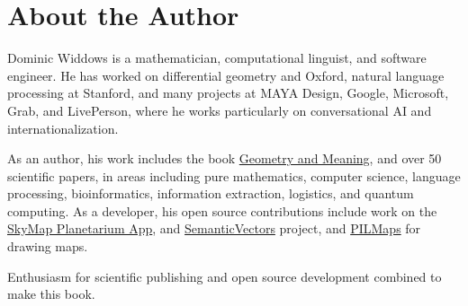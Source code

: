 \chapter{About the Author}

Dominic Widdows is a mathematician, computational linguist, and software engineer.
He has worked on differential geometry and Oxford, natural language processing at Stanford,
and many projects at MAYA Design, Google, Microsoft, Grab, and LivePerson, where he works
particularly on conversational AI and internationalization.

As an author, his work includes the book \href{https://www.amazon.com/-/dp/B00J4FZOOY/}{Geometry and Meaning},
and over 50 scientific papers, in areas including pure mathematics,
computer science, language processing, bioinformatics, information extraction, logistics, and quantum computing.
As a developer, his open source contributions include work on the
\href{https://github.com/sky-map-team/stardroid}{SkyMap Planetarium App},
and \href{https://github.com/semanticvectors}{SemanticVectors} project, and
\href{https://github.com/dwiddows/pilmaps}{PILMaps} for drawing maps.

Enthusiasm for scientific publishing and open source development combined to make this book. 





